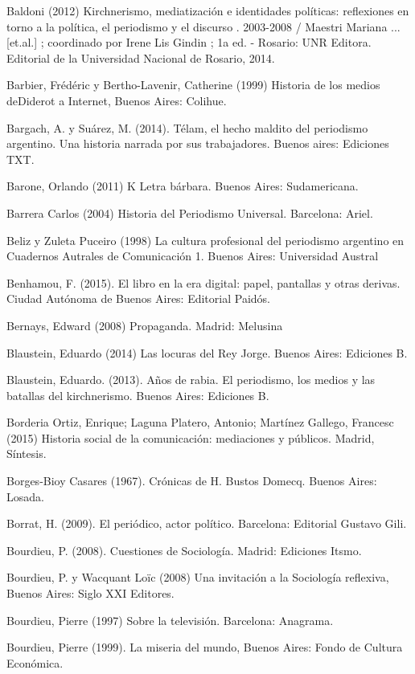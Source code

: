 Baldoni (2012) Kirchnerismo, mediatización e identidades políticas: reflexiones en torno a la política, el periodismo y el discurso . 2003-2008 / Maestri Mariana ... {[}et.al.{]} ; coordinado por Irene Lis Gindin ; 1a ed. - Rosario: UNR Editora. Editorial de la Universidad Nacional de Rosario, 2014.

Barbier, Frédéric y Bertho-Lavenir, Catherine (1999) Historia de los medios deDiderot a Internet, Buenos Aires: Colihue.

Bargach, A. y Suárez, M. (2014). Télam, el hecho maldito del periodismo argentino. Una historia narrada por sus trabajadores. Buenos aires: Ediciones TXT.

Barone, Orlando (2011) K Letra bárbara. Buenos Aires: Sudamericana.

Barrera Carlos (2004) Historia del Periodismo Universal. Barcelona: Ariel.

Beliz y Zuleta Puceiro (1998) La cultura profesional del periodismo argentino en Cuadernos Autrales de Comunicación 1. Buenos Aires: Universidad Austral

Benhamou, F. (2015). El libro en la era digital: papel, pantallas y otras derivas. Ciudad Autónoma de Buenos Aires: Editorial Paidós.

Bernays, Edward (2008) Propaganda. Madrid: Melusina

Blaustein, Eduardo (2014) Las locuras del Rey Jorge. Buenos Aires: Ediciones B.

Blaustein, Eduardo. (2013). Años de rabia. El periodismo, los medios y las batallas del kirchnerismo. Buenos Aires: Ediciones B.

Borderia Ortiz, Enrique; Laguna Platero, Antonio; Martínez Gallego, Francesc (2015) Historia social de la comunicación: mediaciones y públicos. Madrid, Síntesis.

Borges-Bioy Casares (1967). Crónicas de H. Bustos Domecq. Buenos Aires: Losada.

Borrat, H. (2009). El periódico, actor político. Barcelona: Editorial Gustavo Gili.

Bourdieu, P. (2008). Cuestiones de Sociología. Madrid: Ediciones Itsmo.

Bourdieu, P. y Wacquant Loïc (2008) Una invitación a la Sociología reflexiva, Buenos Aires: Siglo XXI Editores.

Bourdieu, Pierre (1997) Sobre la televisión. Barcelona: Anagrama.

Bourdieu, Pierre (1999). La miseria del mundo, Buenos Aires: Fondo de Cultura Económica.

